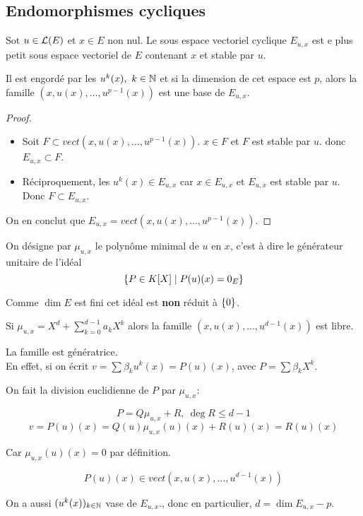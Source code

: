 \subsection{Endomorphismes cycliques}

Sot $u \in \mathcal{L}(E)$ et $x \in E$ non nul.
Le sous espace vectoriel cyclique $E_{u,x}$ est e plus petit sous espace vectoriel de $E$ contenant $x$ et stable par $u$.

Il est engordé par les $u^k(x), \ k \in \mathbb{N}$ et si la dimension de cet espace est $p$, alors la famille
$ (x, u(x), \ldots, u^{p-1}(x))$ est une base de $E_{u,x}$.



\begin{proof}
	\begin{itemize}
		\item
		      Soit $F \subset vect (x, u(x), \ldots, u^{p-1}(x))$.
		      $x \in F$ et $F$ est stable par $u$.
		      donc $E_{u,x} \subset F$.

		\item
		      Réciproquement, les $u^k(x) \in E_{u,x}$ car $x \in E_{u,x}$ et $E_{u,x}$ est stable par $u$.
		      Donc $F \subset E_{u,x}$.
	\end{itemize}
	On en conclut que $E_{u,x} = vect (x, u(x), \ldots, u^{p-1}(x))$.
\end{proof}

On désigne par $\mu_{u,x}$ le polynôme minimal de $u$ en $x$, c'est à dire le générateur unitaire de l'idéal
$$ \left\{P \in K[X] \mid P(u)(x) = 0_E\right\}$$

Comme $\dim E$ est fini cet idéal est \textbf{non} réduit à $\left\{0\right\}$.


Si $\mu_{u,x} = X^d + \sum_{k=0}^{d-1} a_k X^k$ alors la famille $(x, u(x), \ldots, u^{d-1}(x))$ est libre.

La famille est génératrice.\\
En effet, si on écrit $v = \sum \beta_k u^k(x) = P(u)(x)$, avec $P = \sum \beta_k X^k$.

On fait la division euclidienne de $P$ par $\mu_{u,x}$:

$$ P = Q \mu_{u,x} + R, \ \deg R \leq d -1$$
$$ v = P(u)(x) = Q(u) \mu_{u,x}(u)(x) + R(u)(x) = R(u)(x)$$

Car $\mu_{u,x}(u)(x) = 0$ par définition.

$$ P(u)(x) \in vect (x, u(x), \ldots, u^{d-1}(x))$$

On a aussi $(u^k(x))_{k \in \mathbb{N}}$ vase de $E_{u,x}$., donc en particulier, $ d = \dim E_{u,x} - p $.

